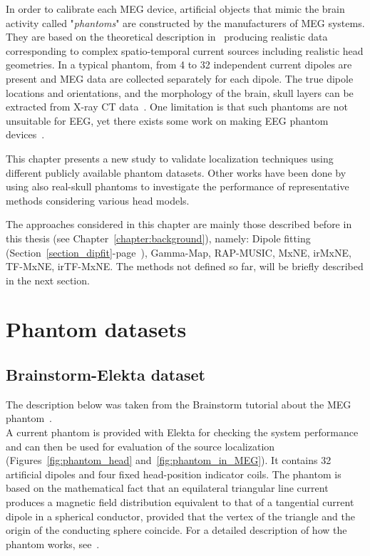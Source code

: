In order to calibrate each MEG device, artificial objects that mimic the brain activity called "\textit{phantoms}" are constructed by the manufacturers of MEG systems.
They are based on the theoretical description in~\cite{ilmoniemi1985forward} producing realistic data corresponding to complex spatio-temporal current sources including realistic head geometries. In a typical phantom, from 4 to 32 independent current dipoles are present and MEG data are collected separately for each dipole. The true dipole locations and orientations, and the morphology of the brain, skull layers can be extracted from X-ray CT data~\cite{leahy1998study}. One limitation is that such phantoms are not unsuitable for EEG, yet there exists some work on making EEG phantom devices~\cite{hairston2016ballistic}.

This chapter presents a new study to validate localization techniques using different publicly available phantom datasets. Other works have been done by~\cite{hazim2015magnetoencephalography,leahy1998study,baillet2001evaluation} using also real-skull phantoms to investigate the performance of representative methods considering various head models.

The approaches considered in this chapter are mainly those described before in this thesis (see Chapter~\ref{chapter:background}), namely: Dipole fitting (Section~\ref{section_dipfit}-page~\pageref{section_dipfit}), Gamma-Map, RAP-MUSIC, MxNE, irMxNE, TF-MxNE, irTF-MxNE. The methods not defined so far, will be briefly described in the next section.

\section{Phantom datasets}
\subsection{Brainstorm-Elekta dataset}
The description below was taken from the Brainstorm tutorial about the MEG phantom~\cite{tadel2011brainstorm}.\\

A current phantom is provided with Elekta for checking the system performance and can then be used for evaluation of the source localization (Figures~\ref{fig:phantom_head} and~\ref{fig:phantom_in_MEG}). It contains 32 artificial dipoles and four fixed head-position indicator coils. The phantom is based on the mathematical fact that an equilateral triangular line current produces a magnetic field distribution equivalent to that of a tangential current dipole in a spherical conductor, provided that the vertex of the triangle and the origin of the conducting sphere coincide. For a detailed description of how the phantom works, see~\cite{ilmoniemi1985forward}.\\
\\

